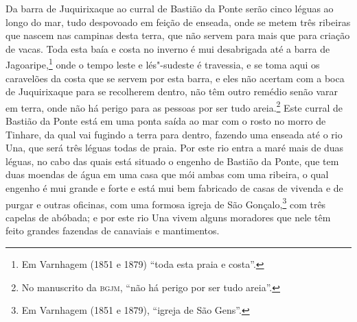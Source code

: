 Da barra de Juquirixaque ao curral de Bastião da Ponte serão cinco léguas ao longo do mar,
tudo despovoado em feição de enseada, onde se metem três ribeiras que nascem nas campinas
desta terra, que não servem para mais que para criação de vacas. Toda esta baía e costa no
inverno é mui desabrigada até a barra de Jagoaripe,\footnote{ Em Varnhagem (1851 e 1879)
``toda esta praia e costa''.} onde o tempo leste e lés"-sudeste é travessia, e se toma
aqui os caravelões da costa que se servem por esta barra, e eles não acertam com a boca de
Juquirixaque para se recolherem dentro, não têm outro remédio senão varar em terra, onde
não há perigo para as pessoas por ser tudo areia.\footnote{ No manuscrito da
\textsc{bgjm}, ``não há perigo por ser tudo areia''.} Este curral de Bastião da Ponte
está em uma ponta saída ao mar com o rosto no morro de Tinhare, da qual vai fugindo a
terra para dentro, fazendo uma enseada até o rio Una, que será três léguas todas de praia.
Por este rio entra a maré mais de duas léguas, no cabo das quais está situado o engenho de
Bastião da Ponte, que tem duas moendas de água em uma casa que mói ambas com uma ribeira,
o qual engenho é mui grande e forte e está mui bem fabricado de casas de vivenda e de
purgar e outras oficinas, com uma formosa igreja de São Gonçalo,\footnote{ Em Varnhagem
(1851 e 1879), ``igreja de São Gens''.} com três capelas de abóbada; e por este rio Una
vivem alguns moradores que nele têm feito grandes fazendas de canaviais e mantimentos.

